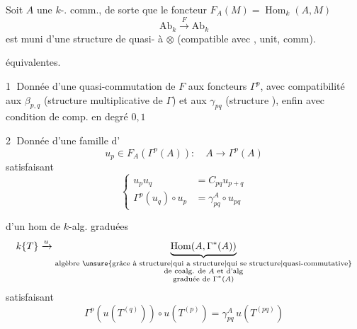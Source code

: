 
Soit $A$ une $k$-.   comm., de sorte que le foncteur $F_A(M)=\operatorname{Hom}_k(A,M)$
\[
\mathrm{Ab}_k\xrightarrow{F}\mathrm{Ab}_k
\]
est muni d'une structure de quasi- à $\otimes$ (compatible avec , unit, comm).

  équivalentes.

\textcircled{1} Donnée d'une quasi-commutation de $F$ aux foncteurs $\Gamma^p$, avec compatibilité aux $\beta_{p,q}$ (structure multiplicative de $\Gamma$) et aux $\gamma_{pq}$ (structure ), enfin avec condition de comp. en degré $0,1$

\textcircled{2} Donnée d'une famille d'
\[
u_p\in F_A(\Gamma^p(A)):\quad A\longrightarrow\Gamma^p(A)
\]
satisfaisant
\[
\left\{\begin{aligned}
u_pu_q&=C_{pq}u_{p+q}\\
\Gamma^p(u_q)\circ u_p&=\gamma^A_{pq}\circ u_{pq}
\end{aligned}\right.
\]

 d'un hom  de $k$-alg. graduées
\[
k\{T\}\xrightarrow{u}\underbrace{\operatorname{Hom}(A,\Gamma^*(A))}_{\substack{\text{algèbre \unsure{grâce à structure|qui a structure|qui se structure|quasi-commutative}}\\\text{de coalg. de }A\text{ et d'alg}\\\text{graduée de }\Gamma^*(A)}}
\]
satisfaisant
\[
\Gamma^p(u(T^{(q)}))\circ u(T^{(p)})=\gamma^A_{pq}\,u(T^{(pq)})
\]
